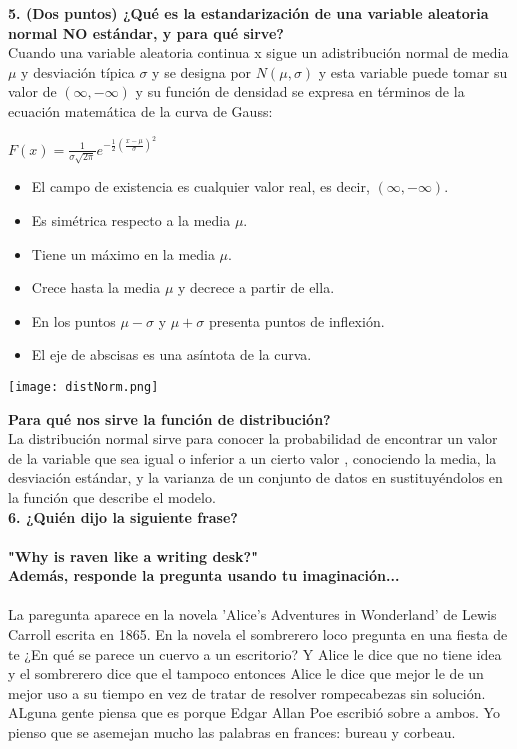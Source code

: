 \renewcommand{\labelenumi}{\alph{enumi})}
\textbf{5. (Dos puntos) ¿Qué es la estandarización de una variable 
aleatoria normal NO estándar, y para qué sirve?}
\\
Cuando una variable aleatoria continua x sigue un adistribuci\'on normal
de media $\mu$ y desviación típica $\sigma$ y se designa por 
$N(\mu, \sigma)$ y esta variable puede tomar su valor de $(\infty, -\infty)$
y su funci\'on de densidad se expresa en t\'erminos de la ecuaci\'on matem\'atica de 
la curva de Gauss:

$F(x) = \frac{1}{\sigma \sqrt{2 \pi}}e^{-\frac{1}{2}(\frac{x -\mu}{\sigma})^{2}}$
\\

\begin{itemize}
    \item El campo de existencia es cualquier valor real, es decir, $(\infty, -\infty)$.

    \item Es simétrica respecto a la media $\mu$.
    
    \item Tiene un máximo en la media $\mu$.
    
    \item Crece hasta la media $\mu$ y decrece a partir de ella.
    
    \item En los puntos $\mu - \sigma$ y $\mu + \sigma$ presenta puntos de inflexión.
    
    \item El eje de abscisas es una asíntota de la curva.
\end{itemize}

\texttt{[image: distNorm.png]}

\textbf{Para qu\'e nos sirve la funci\'on de distribuci\'on?} \\

La distribución normal sirve para conocer la probabilidad de encontrar un valor de la variable que sea igual o inferior a un cierto valor , conociendo la media, la desviación estándar, y la varianza de un conjunto de datos en sustituyéndolos en la función que describe el modelo. \\

\textbf{6. ¿Quién dijo la siguiente frase? \\ \\
"Why is raven like a writing desk?" \\
Además, responde la pregunta usando tu imaginación...}
\\ \\
La paregunta aparece en la novela 'Alice's Adventures in Wonderland'
de Lewis Carroll escrita en 1865. En la novela el sombrerero loco
pregunta en una fiesta de te ¿En qu\'e se parece un cuervo a un escritorio?
Y Alice le dice que no tiene idea y el sombrerero dice que el tampoco entonces 
Alice le dice que mejor le de un mejor uso a su tiempo en vez
de tratar de resolver rompecabezas sin soluci\'on.
ALguna gente piensa que es porque Edgar Allan Poe escribi\'o sobre a
ambos. Yo pienso que se asemejan mucho las palabras en frances: bureau y corbeau.
